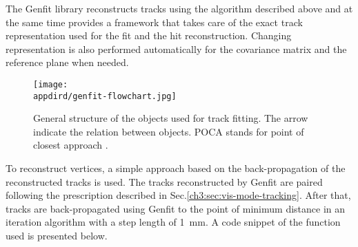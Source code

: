 The Genfit library reconstructs tracks using the algorithm described above and at the same time provides a framework that takes care of the exact track representation used for the fit and the hit reconstruction. Changing representation is also performed automatically for the covariance matrix and the reference plane when needed.


\begin{figure}[bth!]
  \centering
  \texttt{[image: \\appdird/genfit-flowchart.jpg]}
  \caption[genfit flow diagram]{General structure of the objects used for track fitting. The arrow indicate the relation between objects. POCA stands for point of closest approach \cite{genfit}.}
  \label{fig:genfit-diag}
\end{figure}

To reconstruct vertices, a simple approach based on the back-propagation of the reconstructed tracks is used. The tracks reconstructed by Genfit are paired following the prescription described in Sec.\ref{ch3:sec:vis-mode-tracking}. After that, tracks are back-propagated using Genfit to the point of minimum distance in an iteration algorithm with a step length of \SI{1}{\milli\meter}. A code snippet of the function used is presented below.

